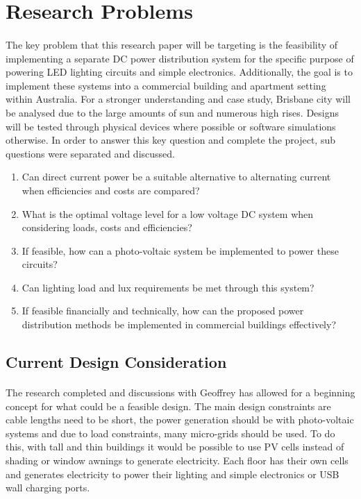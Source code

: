 
\section{Research Problems}

\paragraph{}
The key problem that this research paper will be targeting is the feasibility of implementing a separate DC power distribution system for the specific purpose of powering LED lighting circuits and simple electronics. Additionally, the goal is to implement these systems into a commercial building and apartment setting within Australia. For a stronger understanding and case study, Brisbane city will be analysed due to the large amounts of sun and numerous high rises. Designs will be tested through physical devices where possible or software simulations otherwise. In order to answer this key question and complete the project, sub questions were separated and discussed.

\begin{enumerate}
\itemsep-0.5em 
\item Can direct current power be a suitable alternative to alternating current when efficiencies and costs are compared?
\item What is the optimal voltage level for a low voltage DC system when considering loads, costs and efficiencies?
\item If feasible, how can a photo-voltaic system be implemented to power these circuits?
\item Can lighting load and lux requirements be met through this system?
\item If feasible financially and technically, how can the proposed power distribution methods be implemented in commercial buildings effectively?
\end{enumerate} 

\subsection{Current Design Consideration}

\paragraph{}
The research completed and discussions with Geoffrey has allowed for a beginning concept for what could be a feasible design. The main design constraints are cable lengths need to be short, the power generation should be with photo-voltaic systems and due to load constraints, many micro-grids should be used. To do this, with tall and thin buildings it would be possible to use PV cells instead of shading or window awnings to generate electricity. Each floor has their own cells and generates electricity to power their lighting and simple electronics or USB wall charging ports. 

